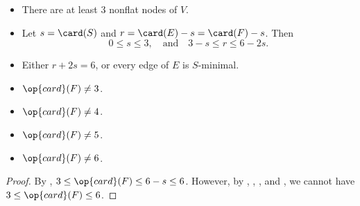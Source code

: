 \begin{lemma}
\begin{itemize}
\item {} There are at least $3$ nonflat nodes of $V$.
\item {} %
Let      $s=\card(S)$ and $r=\card(E) - s = \card(F)-s$.  Then
\begin{displaymath}0\le s \le 3,\quad\text{and}\quad3-s \le r \le 6 -
2s.\end{displaymath}
\item {} Either $r+2s = 6$, or every edge of $E$ is $S$-minimal.
\item {} $\op{card}(F) \ne 3$.
\item {} $\op{card}(F) \ne 4$.
\item {} $\op{card}(F) \ne 5$.
\item {} $\op{card}(F) \ne 6$.
\end{itemize}
\end{lemma}

\begin{proof}
  By , $3\le\op{card}(F)\le 6-s\le 6$.  However, by
  , ,
  , and , we cannot have
  $3\le\op{card}(F)\le 6$.
\end{proof}





